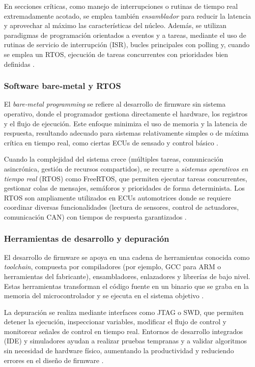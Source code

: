 En secciones críticas, como manejo de interrupciones o rutinas de tiempo real extremadamente acotado, se emplea también \textit{ensamblador} para reducir la latencia y aprovechar al máximo las características del núcleo. Además, se utilizan paradigmas de programación orientados a eventos y a tareas, mediante el uso de rutinas de servicio de interrupción (ISR), bucles principales con polling y, cuando se emplea un RTOS, ejecución de tareas concurrentes con prioridades bien definidas .

\subsubsection{Software bare‑metal y RTOS}
El \textit{bare‑metal programming} se refiere al desarrollo de firmware sin sistema operativo, donde el programador gestiona directamente el hardware, los registros y el flujo de ejecución. Este enfoque minimiza el uso de memoria y la latencia de respuesta, resultando adecuado para sistemas relativamente simples o de máxima crítica en tiempo real, como ciertas ECUs de sensado y control básico \citep{EmbebidosUruguay}.

Cuando la complejidad del sistema crece (múltiples tareas, comunicación asincrónica, gestión de recursos compartidos), se recurre a \textit{sistemas operativos en tiempo real} (RTOS) como FreeRTOS, que permiten ejecutar tareas concurrentes, gestionar colas de mensajes, semáforos y prioridades de forma determinista. Los RTOS son ampliamente utilizados en ECUs automotrices donde se requiere coordinar diversas funcionalidades (lectura de sensores, control de actuadores, comunicación CAN) con tiempos de respuesta garantizados \citep{AutomotiveEmbeddedHandbook}.

\subsubsection{Herramientas de desarrollo y depuración}
El desarrollo de firmware se apoya en una cadena de herramientas conocida como \textit{toolchain}, compuesta por compiladores (por ejemplo, GCC para ARM o herramientas del fabricante), ensambladores, enlazadores y librerías de bajo nivel. Estas herramientas transforman el código fuente en un binario que se graba en la memoria del microcontrolador y se ejecuta en el sistema objetivo .

La depuración se realiza mediante interfaces como JTAG o SWD, que permiten detener la ejecución, inspeccionar variables, modificar el flujo de control y monitorear señales de control en tiempo real. Entornos de desarrollo integrados (IDE) y simuladores ayudan a realizar pruebas tempranas y a validar algoritmos sin necesidad de hardware físico, aumentando la productividad y reduciendo errores en el diseño de firmware \citep{EmbebidosUruguay}.

